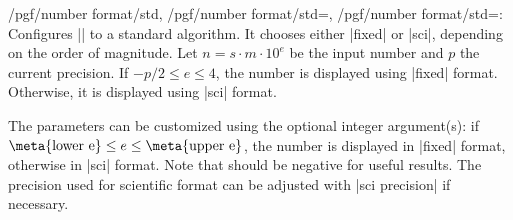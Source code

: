 \begin{keylist}{/pgf/number format/std,%
	/pgf/number format/std=,
	/pgf/number format/std=:}
Configures |\pgfmathprintnumber| to a standard algorithm. It chooses either |fixed| or |sci|, depending on the order of magnitude. Let $n=s \cdot m \cdot 10^e$ be the input number and $p$ the current precision. If $-p/2 \le e \le 4$, the number is displayed using |fixed| format. Otherwise, it is displayed using |sci| format. 

\begin{codeexample}[]
\hspace{1em}
\hspace{1em}
\hspace{1em}
\hspace{1em}
\end{codeexample}
The parameters can be customized using the optional integer argument(s): if $\text{\meta{lower e}} \le e \le \text{\meta{upper e}}$, the number is displayed in |fixed| format, otherwise in |sci| format. Note that  should be negative for useful results. The precision used for scientific format can be adjusted with |sci precision| if necessary.

\end{keylist}


